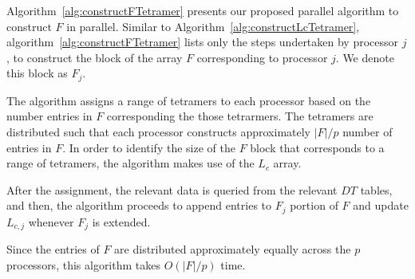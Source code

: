 \documentclass{article}[11pt]
\begin{document}
Algorithm~\ref{alg:constructFTetramer} presents our proposed parallel algorithm to construct $F$ in parallel.
Similar to Algorithm~\ref{alg:constructLcTetramer}, algorithm~\ref{alg:constructFTetramer} lists only the steps undertaken by processor $j$, to construct the block of the array $F$ corresponding to processor $j$. We denote this block as $F_j$. 

The algorithm assigns a range of tetramers to each processor based on the number entries in $F$ corresponding the those tetrarmers. 
The tetramers are distributed such that each processor constructs approximately $|F|/p$ number of entries in $F$. 
In order to identify the size of the $F$ block that corresponds to a range of tetramers, the algorithm makes use of the $L_c$ array.

After the assignment, the relevant data is queried from the relevant $DT$ tables, and then, the algorithm proceeds to append entries to $F_j$ portion of $F$ and update $L_{c,j}$ whenever $F_j$ is extended.

\begin{algorithm}[H]
\caption{Construct $F$ in parallel}
\label{alg:constructFTetramer}
\end{algorithm}
Since the entries of $F$ are distributed approximately equally across the $p$ processors, this algorithm takes $O(|F|/p)$ time.
\end{document}
